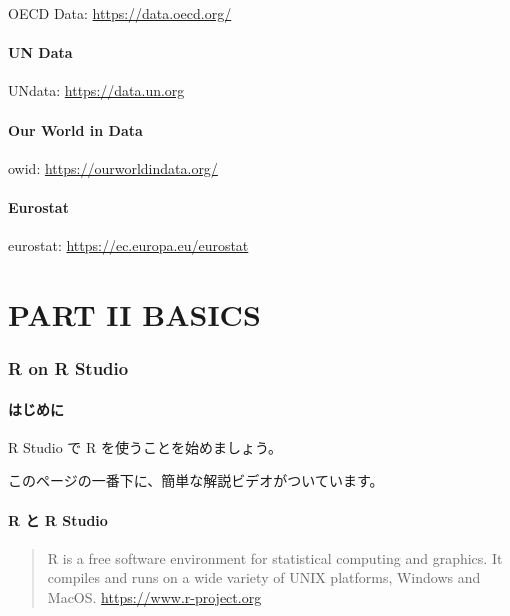 \documentclass[
]{bxjsbook}
\theoremstyle{definition}
\theoremstyle{definition}
\theoremstyle{definition}
\theoremstyle{definition}
\theoremstyle{remark}
\begin{document}
OECD Data: \url{https://data.oecd.org/}

\hypertarget{un-data}{%
\subsection{UN Data}\label{un-data}}

UNdata: \url{https://data.un.org}

\hypertarget{our-world-in-data}{%
\subsection{Our World in Data}\label{our-world-in-data}}

owid: \url{https://ourworldindata.org/}

\hypertarget{eurostat}{%
\subsection{Eurostat}\label{eurostat}}

eurostat: \url{https://ec.europa.eu/eurostat}

\hypertarget{part-part-ii-basics}{%
\part{PART II BASICS}\label{part-part-ii-basics}}

\hypertarget{ronrstudio}{%
\section{R on R Studio}\label{ronrstudio}}

\hypertarget{ux306fux3058ux3081ux306b}{%
\subsection{はじめに}\label{ux306fux3058ux3081ux306b}}

R Studio で R を使うことを始めましょう。

このページの一番下に、簡単な解説ビデオがついています。

\hypertarget{r-ux3068-r-studio}{%
\subsection{R と R Studio}\label{r-ux3068-r-studio}}

\begin{quote}
R is a free software environment for statistical computing and graphics. It compiles and runs on a wide variety of UNIX platforms, Windows and MacOS. \url{https://www.r-project.org}
\end{quote}
\end{document}
